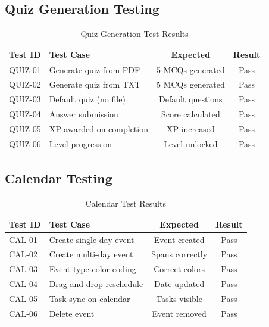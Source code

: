 \subsection{Quiz Generation Testing}
\begin{table}[H]
\centering
\begin{tabular}{|l|p{5cm}|c|c|}
\hline
\textbf{Test ID} & \textbf{Test Case} & \textbf{Expected} & \textbf{Result} \\
\hline
QUIZ-01 & Generate quiz from PDF & 5 MCQs generated & Pass \\
QUIZ-02 & Generate quiz from TXT & 5 MCQs generated & Pass \\
QUIZ-03 & Default quiz (no file) & Default questions & Pass \\
QUIZ-04 & Answer submission & Score calculated & Pass \\
QUIZ-05 & XP awarded on completion & XP increased & Pass \\
QUIZ-06 & Level progression & Level unlocked & Pass \\
\hline
\end{tabular}
\caption{Quiz Generation Test Results}
\end{table}

\subsection{Calendar Testing}
\begin{table}[H]
\centering
\begin{tabular}{|l|p{5cm}|c|c|}
\hline
\textbf{Test ID} & \textbf{Test Case} & \textbf{Expected} & \textbf{Result} \\
\hline
CAL-01 & Create single-day event & Event created & Pass \\
CAL-02 & Create multi-day event & Spans correctly & Pass \\
CAL-03 & Event type color coding & Correct colors & Pass \\
CAL-04 & Drag and drop reschedule & Date updated & Pass \\
CAL-05 & Task sync on calendar & Tasks visible & Pass \\
CAL-06 & Delete event & Event removed & Pass \\
\hline
\end{tabular}
\caption{Calendar Test Results}
\end{table}


